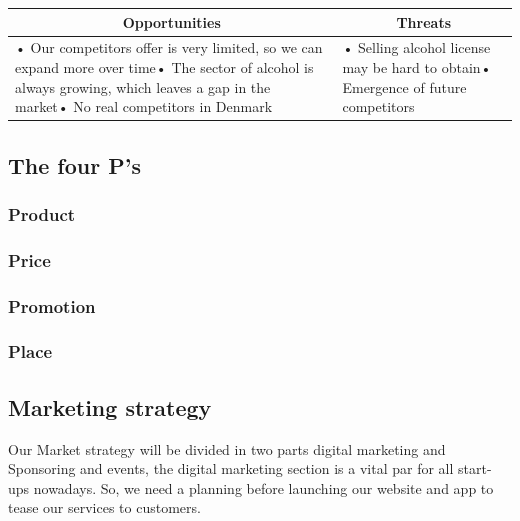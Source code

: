 \documentclass[12p]{article}
\begin{document}
\begin{table}[htbp]
  \centering
    \begin{tabular}{|p{}|p{}|}
    \hline
    \multicolumn{1}{|c|}{\textbf{Opportunities}} & \multicolumn{1}{c|}{\textbf{Threats}} \\
    \hline
    {• Our competitors offer is very limited, so we can expand more over time\newline{}• The sector of alcohol is always growing, which leaves a gap in the market\newline{}• No real competitors in Denmark} & • Selling alcohol license may be hard to obtain\newline{}• Emergence of future competitors \\
    \hline
    \end{tabular}
  \label{tab:addlabel}
\end{table}


\newpage


\subsection{The four P's} \label{PPPP}

\subsubsection{Product}
\subsubsection{Price}

\subsubsection{Promotion}
\subsubsection{Place}

\newpage


\subsection{Marketing strategy} \label{MarketingStrategy}
Our Market strategy will be divided in two parts digital marketing and Sponsoring and events, the digital marketing section is a vital par for all start-ups nowadays.
So, we need a planning before launching our website and app to tease our services to customers.
\end{document}
